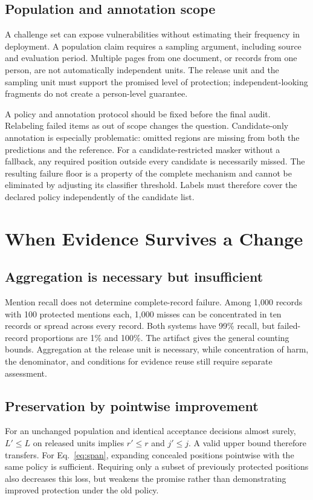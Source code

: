 \documentclass[conference]{IEEEtran}
\begin{document}
\subsection{Population and annotation scope}
A challenge set can expose vulnerabilities without estimating their frequency in deployment. A population claim requires a sampling argument, including source and evaluation period. Multiple pages from one document, or records from one person, are not automatically independent units. The release unit and the sampling unit must support the promised level of protection; independent-looking fragments do not create a person-level guarantee.

A policy and annotation protocol should be fixed before the final audit. Relabeling failed items as out of scope changes the question. Candidate-only annotation is especially problematic: omitted regions are missing from both the predictions and the reference. For a candidate-restricted masker without a fallback, any required position outside every candidate is necessarily missed. The resulting failure floor is a property of the complete mechanism and cannot be eliminated by adjusting its classifier threshold. Labels must therefore cover the declared policy independently of the candidate list.

\section{When Evidence Survives a Change}
\subsection{Aggregation is necessary but insufficient}
Mention recall does not determine complete-record failure. Among 1,000 records with 100 protected mentions each, 1,000 misses can be concentrated in ten records or spread across every record. Both systems have 99\% recall, but failed-record proportions are 1\% and 100\%. The artifact gives the general counting bounds. Aggregation at the release unit is necessary, while concentration of harm, the denominator, and conditions for evidence reuse still require separate assessment.

\subsection{Preservation by pointwise improvement}
For an unchanged population and identical acceptance decisions almost surely, $L'\leq L$ on released units implies $r'\leq r$ and $j'\leq j$. A valid upper bound therefore transfers. For Eq.~\eqref{eq:span}, expanding concealed positions pointwise with the same policy is sufficient. Requiring only a subset of previously protected positions also decreases this loss, but weakens the promise rather than demonstrating improved protection under the old policy.
\end{document}
